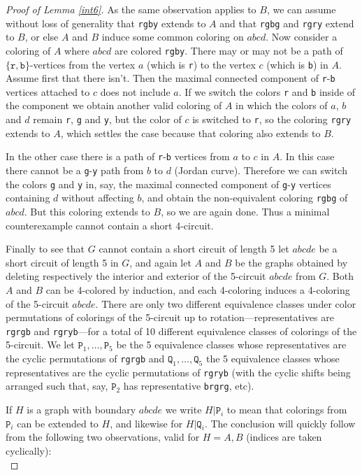 \documentclass[11pt]{article}
\newcommand{\cR}{\texttt{r}}
\newcommand{\cG}{\texttt{g}}
\newcommand{\cB}{\texttt{b}}
\newcommand{\cY}{\texttt{y}}
\newcommand{\rA}[1]{\texttt{P}_{{#1}}}
\newcommand{\rB}[1]{\texttt{Q}_{#1}}
\newcommand{\gA}{A}
\newcommand{\gB}{B}
\begin{document}
\begin{proof}[Proof of Lemma \ref{int6}]
As the same observation applies to $\gB$, we can assume without loss of generality that \cR\cG\cB\cY{} extends to $\gA$ and that \cR\cG\cB\cG{} and \cR\cG\cR\cY{} extend to $\gB$, or else $\gA$ and $\gB$ induce some common coloring on $abcd$. Now consider a coloring of $\gA$ where $abcd$ are colored \cR\cG\cB\cY{}. There may or may not be a path of $\{\cR,\cB\}$-vertices from the vertex $a$ (which is \cR) to the vertex $c$ (which is \cB) in $\gA$. Assume first that there isn't. Then the maximal connected component of \cR-\cB{} vertices attached to $c$ does not include $a$. If we switch the colors \cR{} and \cB{} inside of the component we obtain another valid coloring of $\gA$
in which the colors of $a$, $b$ and $d$ remain \cR, \cG{} and \cY, but the color of $c$ is switched to \cR, so the coloring \cR\cG\cR\cY{} extends to $\gA$, which settles the case because that coloring also extends to $\gB$. 

In the other case there is a path of \cR-\cB{} vertices from $a$ to $c$ in $\gA$. In this case 
there cannot be a \cG-\cY{} path from $b$ to $d$ (Jordan curve). Therefore we can switch the colors \cG{} and \cY{} in, say, the maximal connected component of \cG-\cY{} vertices containing $d$ without affecting $b$, and obtain the non-equivalent coloring \cR\cG\cB\cG{} of $abcd$. But this coloring extends to $\gB$, so we are again done. Thus a minimal counterexample cannot contain a short 4-circuit.

Finally to see that $G$ cannot contain a short circuit of length 5 let $abcde$ be a short circuit of length 5 in $G$, and again let $\gA$ and $\gB$ be the graphs obtained by deleting respectively the interior and exterior of the 5-circuit $abcde$ from $G$. Both $\gA$ and $\gB$ can be 4-colored by induction, and each 4-coloring induces a 4-coloring of the 5-circuit $abcde$. There are only two different equivalence classes under color permutations of colorings of the 5-circuit up to rotation---representatives are \cR\cG\cR\cG\cB{} and \cR\cG\cR\cY\cB---for a total of 10 different equivalence classes of colorings of the 5-circuit. We let $\rA{1}, \dots, \rA{5}$ be the 5 equivalence classes whose representatives are the cyclic permutations of \cR\cG\cR\cG\cB{} and $\rB{1}, \dots, \rB{5}$ the 5 equivalence classes whose representatives are the cyclic permutations of  \cR\cG\cR\cY\cB{} (with the cyclic shifts being arranged such that, say, $\rA{2}$ has representative \cB\cR\cG\cR\cG, etc). 

If $H$ is a graph with boundary $abcde$ we write $H|\rA{i}$ to mean that colorings from $\rA{i}$ can be extended to $H$, and likewise for $H|\rB{i}$. The conclusion will quickly follow from the following two observations, valid for $H = \gA, \gB$ (indices are taken cyclically):\\


\end{proof}
\end{document}
